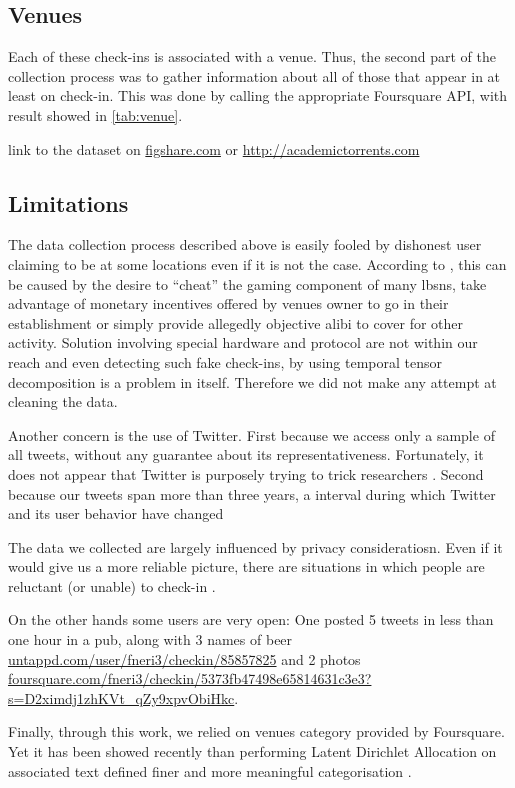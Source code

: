 \subsection{Venues}

Each of these check-ins is associated with a venue. Thus, the second part of
the collection process was to gather information about all of those
 that appear in at least on check-in. This was done by calling the
appropriate Foursquare API, with result showed in \autoref{tab:venue}.

\begin{comments}
link to the dataset on
\href{http://figshare.com/authors/G\%C3\%A9raud\%20Le\%20Falher/542931}%
{\url{figshare.com}} or \url{http://academictorrents.com}
\end{comments}

\subsection{Limitations}

The data collection process described above is easily fooled by dishonest user
claiming to be at some locations even if it is not the case. According to
\autocite{FakeCheckins12}, this can be caused by the desire to \enquote{cheat}
the gaming component of many \glspl{lbsn}, take advantage of monetary
incentives offered by venues owner to go in their establishment or simply
provide allegedly objective alibi to cover for other activity. Solution
involving special hardware and protocol are not within our reach
\autocite{ValidateCheckin13} and even detecting such fake check-ins, by using
temporal tensor decomposition \autocite{FindingFake14} is a problem in itself.
Therefore we did not make any attempt at cleaning the data.

Another concern is the use of Twitter. First because we access only a sample
of all tweets, without any guarantee about its representativeness.
Fortunately, it does not appear that Twitter is purposely trying to trick
researchers \autocite{TwitterBias14}. Second because our tweets span more than
three years, a interval during which Twitter and its user behavior have
changed \autocite{TwitterEvolution14}

The data we collected are largely influenced by privacy consideratiosn.
Even if it would give us a more reliable picture, there are situations in
which people are reluctant (or unable) to check-in \autocite{Privacy11}.
\begin{comments}
On the other hands some users are very open: One posted 5 tweets in less than
one hour in a pub, along with 3 names of beer
\href{https://untappd.com/user/fneri3/checkin/85857825}%
{\url{untappd.com/user/fneri3/checkin/85857825}} and 2 photos
\href{https://foursquare.com/fneri3/checkin/5373fb47498e65814631c3e3?s=D2ximdj1zhKVt_qZy9xpvObiHkc}%
{\url{foursquare.com/fneri3/checkin/5373fb47498e65814631c3e3?s=D2ximdj1zhKVt_qZy9xpvObiHkc}}.
\end{comments}

Finally, through this work, we relied on venues category provided by
Foursquare. Yet it has been showed recently than performing Latent Dirichlet
Allocation on associated text defined finer and more meaningful categorisation
\autocite{PlaceSemantic14}.
